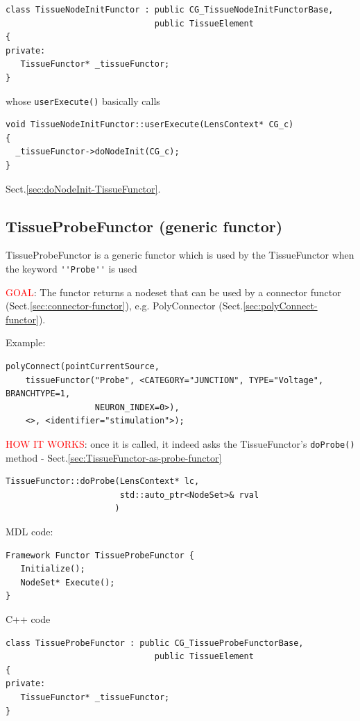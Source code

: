\begin{lstlisting}
class TissueNodeInitFunctor : public CG_TissueNodeInitFunctorBase, 
                              public TissueElement
{
private:
   TissueFunctor* _tissueFunctor;
}
\end{lstlisting}

whose \verb!userExecute()! basically calls
\begin{verbatim}
void TissueNodeInitFunctor::userExecute(LensContext* CG_c) 
{
  _tissueFunctor->doNodeInit(CG_c);
}
\end{verbatim}
Sect.\ref{sec:doNodeInit-TissueFunctor}.

\subsection{TissueProbeFunctor (generic functor)}
\label{sec:TissueFunctor-probe}
\label{sec:TissueProbeFunctor}

TissueProbeFunctor is a generic functor which is used by the TissueFunctor when
the keyword \verb!''Probe''! is used

\textcolor{red}{GOAL}: The functor returns a nodeset that can be used by a
connector functor (Sect.\ref{sec:connector-functor}), e.g. PolyConnector
(Sect.\ref{sec:polyConnect-functor}).

Example:
\begin{verbatim}
polyConnect(pointCurrentSource, 
    tissueFunctor("Probe", <CATEGORY="JUNCTION", TYPE="Voltage", BRANCHTYPE=1,
                  NEURON_INDEX=0>), 
    <>, <identifier="stimulation">);
\end{verbatim}

\textcolor{red}{HOW IT WORKS}: once it is called, it indeed asks the
TissueFunctor's \verb!doProbe()! method -
Sect.\ref{sec:TissueFunctor-as-probe-functor}
\begin{verbatim}
TissueFunctor::doProbe(LensContext* lc, 
                       std::auto_ptr<NodeSet>& rval
                      )
\end{verbatim}

MDL code:
\begin{lstlisting}
Framework Functor TissueProbeFunctor {
   Initialize();
   NodeSet* Execute();
}
\end{lstlisting}

C++ code
\begin{lstlisting}
class TissueProbeFunctor : public CG_TissueProbeFunctorBase, 
                              public TissueElement
{
private:
   TissueFunctor* _tissueFunctor;
}
\end{lstlisting}

